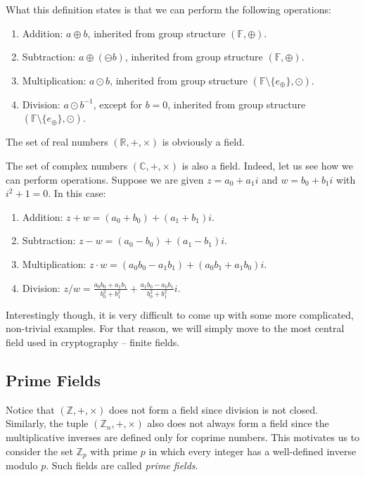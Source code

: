 \documentclass[../../book.tex]{subfiles}
\begin{document}
What this definition states is that we can perform the following operations:
\begin{enumerate}
    \item Addition: $a \oplus b$, inherited from group structure $(\mathbb{F}, \oplus)$.
    \item Subtraction: $a \oplus (\ominus b)$, inherited from group structure $(\mathbb{F}, \oplus)$.
    \item Multiplication: $a \odot b$, inherited from group structure $(\mathbb{F} \setminus \{e_{\oplus}\}, \odot)$.
    \item Division: $a \odot b^{-1}$, except for $b=0$, inherited from group structure $(\mathbb{F} \setminus \{e_{\oplus}\}, \odot)$.
\end{enumerate}

\begin{example}
    The set of real numbers $(\mathbb{R}, +, \times)$ is obviously a field.
\end{example}

\begin{example}
    The set of complex numbers $(\mathbb{C}, +, \times)$ is also a field. Indeed, let us see how we can perform 
    operations. Suppose we are given $z = a_0 + a_1i$ and $w = b_0 + b_1i$ with $i^2+1=0$. In this case:
    \begin{enumerate}
        \item Addition: $z + w = (a_0 + b_0) + (a_1 + b_1)i$.
        \item Subtraction: $z - w = (a_0 - b_0) + (a_1 - b_1)i$.
        \item Multiplication: $z \cdot w = (a_0b_0 - a_1b_1) + (a_0b_1 + a_1b_0)i$.
        \item Division: $z / w = \frac{a_0b_0 + a_1b_1}{b_0^2 + b_1^2} + \frac{a_1b_0 - a_0b_1}{b_0^2 + b_1^2}i$.
    \end{enumerate}
\end{example}

Interestingly though, it is very difficult to come up with some more complicated, non-trivial examples. For that 
reason, we will simply move to the most central field used in cryptography -- finite fields.

\subsection{Prime Fields}
Notice that $(\mathbb{Z},+,\times)$ does not form a field since division is not
closed. Similarly, the tuple $(\mathbb{Z}_n,+,\times)$ also does not always form
a field since the multiplicative inverses are defined only for coprime numbers.
This motivates us to consider the set $\mathbb{Z}_p$ with prime $p$ in which
every integer has a well-defined inverse modulo $p$. Such fields are called
\textit{prime fields}. 
\end{document}
